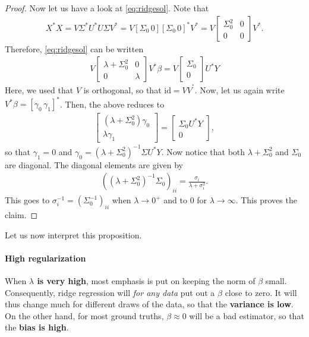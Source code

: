 \documentclass{article}
\newcommand{\id}{\mathrm{id}}
\begin{document}
\begin{proof}
    Now let us have a look at \eqref{eq:ridgesol}. Note that 
\begin{align*}
    X^*X = V\Sigma^*U^*U \Sigma V^* = V  [\Sigma_0 \, 0] [\Sigma_0 \, 0]^* V^* = V\begin{bmatrix} \Sigma_0^2 & 0 \\ 0 & 0 \end{bmatrix} V^*.
\end{align*}
Therefore,  \eqref{eq:ridgesol} can be written
\begin{align*}
    V\begin{bmatrix} \lambda + \Sigma_0^2 & 0 \\ 0 & \lambda \end{bmatrix} V^*\beta = V\begin{bmatrix} \Sigma_0 \\ 0 \end{bmatrix} U^*Y
\end{align*}
Here, we used that $V$ is orthogonal, so that $\id = VV^^*$. Now, let us again write $V^* \beta = [\gamma_0 \, \gamma_1]^*$. Then, the above reduces to 
    \begin{align*}
        \begin{bmatrix} (\lambda + \Sigma_0^2) \gamma_0 \\ \lambda \gamma_1 \end{bmatrix} = \begin{bmatrix}
            \Sigma_0 U^*Y \\ 0 
        \end{bmatrix},
    \end{align*} 
    so that $\gamma_1 = 0$ and $\gamma_0 = (\lambda + \Sigma_0^2)^{-1}\Sigma U^*Y$. Now notice that both $\lambda + \Sigma_0^2$ and $\Sigma_0$ are diagonal. The diagonal elements are given by
    \begin{align*}
        ((\lambda + \Sigma_0^2)^{-1}\Sigma_0)_{ii} = \frac{\sigma_i}{\lambda +\sigma_i^2}.
    \end{align*}
    This goes to $\sigma_i^{-1}=(\Sigma_0^{-1})_{ii}$ when $\lambda\to 0^+$ and to $0$ for $\lambda \to \infty$. This proves the claim.

\end{proof}

Let us now interpret this proposition.

\paragraph{High regularization} When \textbf{$\lambda$ is very high}, most emphasis is put on keeping the norm of $\beta$ small. Consequently, ridge regression will \emph{for any data} put out a $\beta$ close to zero.  It will thus change much for different draws of the data, so that the \textbf{variance is low}. On the other hand, for most ground truths, $\beta\approx 0$ will be a bad estimator, so that the \textbf{bias is high}.
\end{document}
